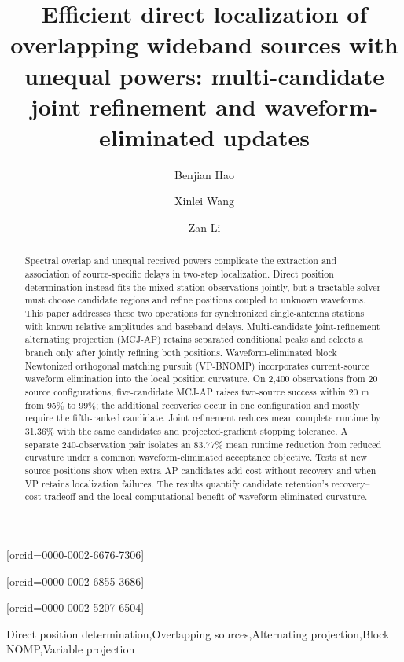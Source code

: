 \documentclass[a4paper,fleqn,review]{cas-sc}
\begin{document}
\let\WriteBookmarks\relax
{}
\title[mode=title]{Efficient direct localization of overlapping wideband sources with unequal powers: multi-candidate joint refinement and waveform-eliminated updates}
\author[inst1]{Benjian Hao}[orcid=0000-0002-6676-7306]
\author[inst1]{Xinlei Wang}[orcid=0000-0002-6855-3686]
\author[inst1]{Zan Li}[orcid=0000-0002-5207-6504]
\cormark[1]
\begin{abstract}
Spectral overlap and unequal received powers complicate the extraction and association of source-specific delays in two-step localization. Direct position determination instead fits the mixed station observations jointly, but a tractable solver must choose candidate regions and refine positions coupled to unknown waveforms. This paper addresses these two operations for synchronized single-antenna stations with known relative amplitudes and baseband delays. Multi-candidate joint-refinement alternating projection (MCJ-AP) retains separated conditional peaks and selects a branch only after jointly refining both positions. Waveform-eliminated block Newtonized orthogonal matching pursuit (VP-BNOMP) incorporates current-source waveform elimination into the local position curvature. On 2,400 observations from 20 source configurations, five-candidate MCJ-AP raises two-source success within 20 m from 95\% to 99\%; the additional recoveries occur in one configuration and mostly require the fifth-ranked candidate. Joint refinement reduces mean complete runtime by 31.36\% with the same candidates and projected-gradient stopping tolerance. A separate 240-observation pair isolates an 83.77\% mean runtime reduction from reduced curvature under a common waveform-eliminated acceptance objective. Tests at new source positions show when extra AP candidates add cost without recovery and when VP retains localization failures. The results quantify candidate retention's recovery--cost tradeoff and the local computational benefit of waveform-eliminated curvature.
\end{abstract}
\begin{keywords}
Direct position determination\sep Overlapping sources\sep Alternating projection\sep Block NOMP\sep Variable projection
\end{keywords}
\maketitle
\end{document}
